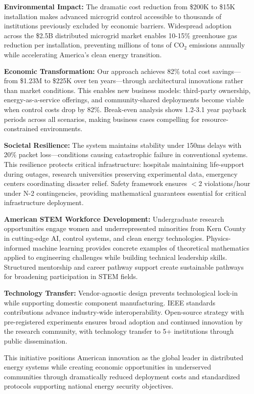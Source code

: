 \documentclass[12pt]{article}
\begin{document}
\textbf{Environmental Impact:} The dramatic cost reduction from \$200K to \$15K installation makes advanced microgrid control accessible to thousands of institutions previously excluded by economic barriers. Widespread adoption across the \$2.5B distributed microgrid market enables 10-15\% greenhouse gas reduction per installation, preventing millions of tons of CO$_2$ emissions annually while accelerating America's clean energy transition.

\textbf{Economic Transformation:} Our approach achieves 82\% total cost savings—from \$1.23M to \$225K over ten years—through architectural innovations rather than market conditions. This enables new business models: third-party ownership, energy-as-a-service offerings, and community-shared deployments become viable when control costs drop by 82\%. Break-even analysis shows 1.2-3.1 year payback periods across all scenarios, making business cases compelling for resource-constrained environments.

\textbf{Societal Resilience:} The system maintains stability under 150ms delays with 20\% packet loss—conditions causing catastrophic failure in conventional systems. This resilience protects critical infrastructure: hospitals maintaining life-support during outages, research universities preserving experimental data, emergency centers coordinating disaster relief. Safety framework ensures $<$2 violations/hour under N-2 contingencies, providing mathematical guarantees essential for critical infrastructure deployment.

\textbf{American STEM Workforce Development:} Undergraduate research opportunities engage women and underrepresented minorities from Kern County in cutting-edge AI, control systems, and clean energy technologies. Physics-informed machine learning provides concrete examples of theoretical mathematics applied to engineering challenges while building technical leadership skills. Structured mentorship and career pathway support create sustainable pathways for broadening participation in STEM fields.

\textbf{Technology Transfer:} Vendor-agnostic design prevents technological lock-in while supporting domestic component manufacturing. IEEE standards contributions advance industry-wide interoperability. Open-source strategy with pre-registered experiments ensures broad adoption and continued innovation by the research community, with technology transfer to 5+ institutions through public dissemination.

This initiative positions American innovation as the global leader in distributed energy systems while creating economic opportunities in underserved communities through dramatically reduced deployment costs and standardized protocols supporting national energy security objectives.
\end{document}
